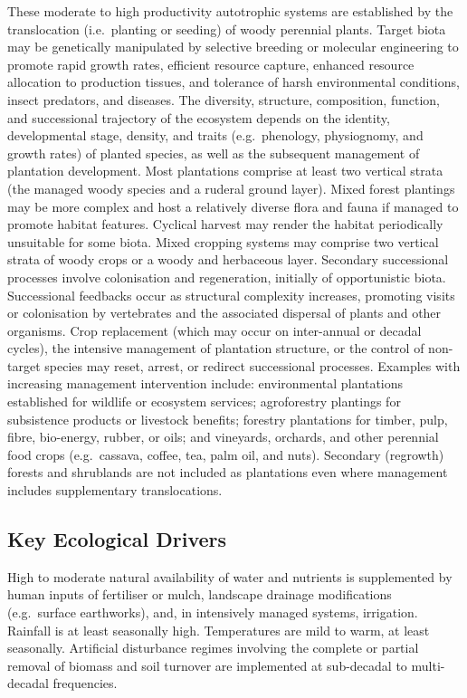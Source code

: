\documentclass[
  letterpaper,
  DIV=11,
  numbers=noendperiod]{scrartcl}
\begin{document}
These moderate to high productivity autotrophic systems are established
by the translocation (i.e.~planting or seeding) of woody perennial
plants. Target biota may be genetically manipulated by selective
breeding or molecular engineering to promote rapid growth rates,
efficient resource capture, enhanced resource allocation to production
tissues, and tolerance of harsh environmental conditions, insect
predators, and diseases. The diversity, structure, composition,
function, and successional trajectory of the ecosystem depends on the
identity, developmental stage, density, and traits (e.g.~phenology,
physiognomy, and growth rates) of planted species, as well as the
subsequent management of plantation development. Most plantations
comprise at least two vertical strata (the managed woody species and a
ruderal ground layer). Mixed forest plantings may be more complex and
host a relatively diverse flora and fauna if managed to promote habitat
features. Cyclical harvest may render the habitat periodically
unsuitable for some biota. Mixed cropping systems may comprise two
vertical strata of woody crops or a woody and herbaceous layer.
Secondary successional processes involve colonisation and regeneration,
initially of opportunistic biota. Successional feedbacks occur as
structural complexity increases, promoting visits or colonisation by
vertebrates and the associated dispersal of plants and other organisms.
Crop replacement (which may occur on inter-annual or decadal cycles),
the intensive management of plantation structure, or the control of
non-target species may reset, arrest, or redirect successional
processes. Examples with increasing management intervention include:
environmental plantations established for wildlife or ecosystem
services; agroforestry plantings for subsistence products or livestock
benefits; forestry plantations for timber, pulp, fibre, bio-energy,
rubber, or oils; and vineyards, orchards, and other perennial food crops
(e.g.~cassava, coffee, tea, palm oil, and nuts). Secondary (regrowth)
forests and shrublands are not included as plantations even where
management includes supplementary translocations.

\subsection{Key Ecological Drivers}\label{key-ecological-drivers-100}

High to moderate natural availability of water and nutrients is
supplemented by human inputs of fertiliser or mulch, landscape drainage
modifications (e.g.~surface earthworks), and, in intensively managed
systems, irrigation. Rainfall is at least seasonally high. Temperatures
are mild to warm, at least seasonally. Artificial disturbance regimes
involving the complete or partial removal of biomass and soil turnover
are implemented at sub-decadal to multi-decadal frequencies.
\end{document}
